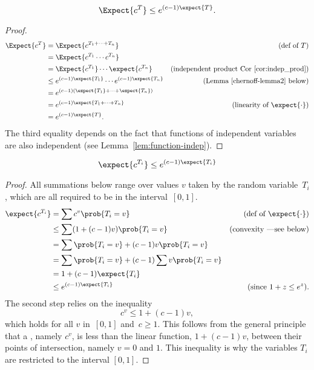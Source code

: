 \begin{lemma}\label{chernoff-lemma1}
\[
    \Expect{c^T} \leq e^{(c-1) \expect{T}}.
\]
\end{lemma}

\begin{proof}
\begin{align*}
    \Expect{c^T} & = \Expect{c^{T_1 + \cdots + T_n}}
                 & \text{(def of $T$)}\\
            & = \Expect{c^{T_1} \cdots c^{T_n}} \\
            & = \Expect{c^{T_1}}  \cdots \expect{c^{T_n}}
                 & \text{(independent product Cor~\ref{cor:indep_prod})}\\
            & \leq e^{(c-1) \expect{T_1}} \cdots  e^{(c-1) \expect{T_n}}
               & \text{(Lemma~\ref{chernoff-lemma2} below)}\\
            & = e^{(c-1) (\expect{T_1} + \cdots + \expect{T_n})} \\
            & = e^{(c-1) \expect{T_1 + \cdots + T_n}}
                   & \text{(linearity of $\expect{\cdot}$)}\\
            & = e^{(c-1) \expect{T}}.
\end{align*}
The third equality depends on the fact that functions of independent
variables are also independent (see Lemma~\ref{lem:function-indep}).
\end{proof}

\begin{lemma}
\label{chernoff-lemma2}
\[
    \expect{c^{T_i}} \leq e^{(c - 1) \expect{T_i}}
\]
\end{lemma}

\begin{proof}
All summations below range over values $v$ taken by the random
variable~$T_i$, which are all required to be in the interval~$[0, 1]$.
\begin{align*}
\expect{c^{T_i}}
     & = \sum c^v \prob{T_i = v}
              & \text{(def of $\expect{\cdot}$)}\\
     & \leq \sum (1 + (c-1) v) \prob{T_i = v} 
          & \text{(convexity ---see below)}\\
     & = \sum \prob{T_i = v} + (c-1) v \prob{T_i = v} \\
     & = \sum \prob{T_i = v} +  (c-1) \sum v \prob{T_i = v} \\
     & = 1 + (c - 1) \expect{T_i} \\
     & \leq e^{(c - 1) \expect{T_i}}
           & \text{(since $1 + z \leq e^z$)}.
\end{align*}
The second step relies on the inequality
\[
c^v \leq 1 + (c-1) v,
\]
which holds for all $v$ in~$[0,1]$ and~$c \geq 1$.  This follows from
the general principle that a , namely $c^v$, is
less than the linear function, $1 + (c-1) v$, between their points of
intersection, namely $v = 0$ and $1$.  This inequality is why the
variables $T_i$ are restricted to the interval $[0, 1]$.
\end{proof}

